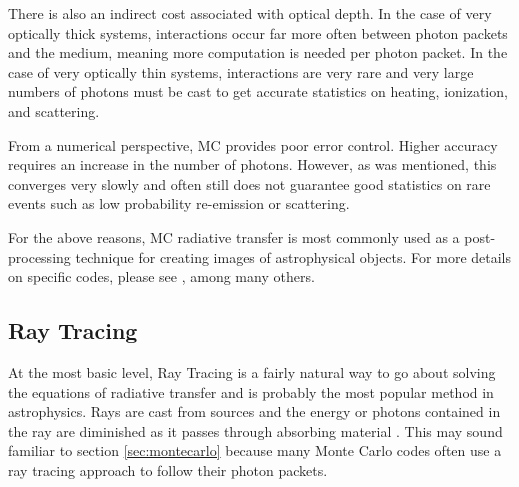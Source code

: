 There is also an indirect cost associated with optical depth. In the case of very optically thick systems, interactions occur far more often between photon packets and the medium, meaning more computation is needed per photon packet. In the case of very optically thin systems, interactions are very rare and very large numbers of photons must be cast to get accurate statistics on heating, ionization, and scattering. 

From a numerical perspective, MC provides poor error control. Higher accuracy requires an increase in the number of photons. However, as was mentioned, this converges very slowly and often still does not guarantee good statistics on rare events such as low probability re-emission or scattering.

For the above reasons, MC radiative transfer is most commonly used as a post-processing technique for creating images of astrophysical objects. For more details on specific codes, please see \citet{dullemond12,cantalupoPorciani11,altayEt08,ercolanoEt03,nenkovaEt99,lucy99,harriesHowarth97}, among many others.




\subsection{Ray Tracing}
\label{sec:raytracing}

At the most basic level, Ray Tracing is a fairly natural way to go about solving the equations of radiative transfer and is probably the most popular method in astrophysics. Rays are cast from sources and the energy or photons contained in the ray are diminished as it passes through absorbing material \citep{altayTheuns13, razoumovScott99,abelNormanMadau99}. This may sound familiar to section \ref{sec:montecarlo} because many Monte Carlo codes often use a ray tracing approach to follow their photon packets.

